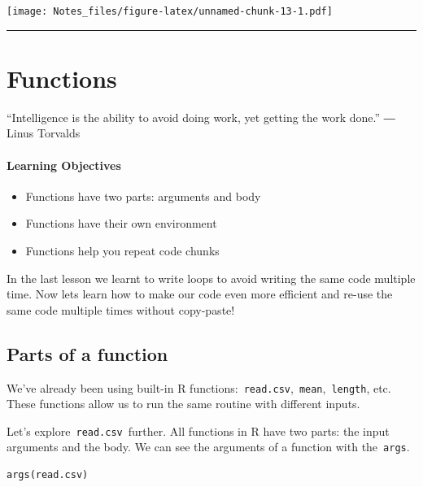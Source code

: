 \documentclass[
]{book}
\providecommand{\tightlist}{%
  \setlength{\itemsep}{0pt}\setlength{\parskip}{0pt}}
\begin{document}
\texttt{[image: Notes\_files/figure-latex/unnamed-chunk-13-1.pdf]}

\begin{center}\rule{0.5\linewidth}{0.5pt}\end{center}

\hypertarget{functions}{%
\chapter{Functions}\label{functions}}

``Intelligence is the ability to avoid doing work, yet getting the work done.''
― Linus Torvalds

\hypertarget{learning-objectives-2}{%
\subsubsection*{Learning Objectives}\label{learning-objectives-2}}

\begin{itemize}
\tightlist
\item
  Functions have two parts: arguments and body
\item
  Functions have their own environment
\item
  Functions help you repeat code chunks
\end{itemize}

In the last lesson we learnt to write loops to avoid writing the same code multiple time. Now lets learn how to make our code even more efficient and re-use the same code multiple times without copy-paste!

\hypertarget{parts-of-a-function}{%
\section{Parts of a function}\label{parts-of-a-function}}

We've already been using built-in R functions:~\texttt{read.csv},~\texttt{mean},~\texttt{length}, etc. These functions allow us to run the same routine with different inputs.

Let's explore~\texttt{read.csv}~further. All functions in R have two parts: the input arguments and the body. We can see the arguments of a function with the~\texttt{args}.

\begin{verbatim}
args(read.csv)
\end{verbatim}
\end{document}
